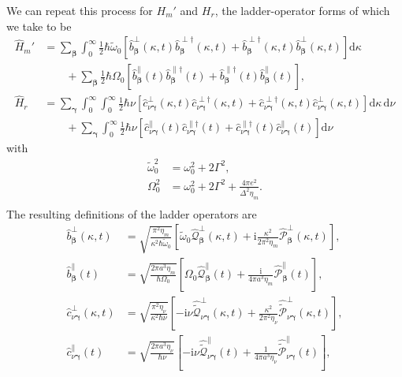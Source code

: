 \documentclass{article}
\begin{document}
We can repeat this process for $H_m'$ and $H_r$, the ladder-operator forms of which we take to be
\begin{equation}
\begin{split}
\hat{H}_m' &= \sum_{\bm{\beta}}\int_0^\infty\frac{1}{2}\hbar\tilde{\omega}_0\left[\hat{b}_{\bm{\beta}}^\perp(\kappa,t)\hat{b}_{\bm{\beta}}^{\perp\dagger}(\kappa,t) + \hat{b}_{\bm{\beta}}^{\perp\dagger}(\kappa,t)\hat{b}_{\bm{\beta}}^\perp(\kappa,t)\right]\mathrm{d}\kappa\\
&\qquad + \sum_{\bm{\beta}}\frac{1}{2}\hbar\Omega_0\left[\hat{b}_{\bm{\beta}}^\parallel(t)\hat{b}_{\bm{\beta}}^{\parallel\dagger}(t) + \hat{b}_{\bm{\beta}}^{\parallel\dagger}(t)\hat{b}_{\bm{\beta}}^\parallel(t)\right],\\
\hat{H}_r &= \sum_{\bm{\gamma}}\int_0^\infty\int_0^\infty\frac{1}{2}\hbar\nu\left[\hat{c}_{\nu\bm{\gamma}}^\perp(\kappa,t)\hat{c}_{\nu\bm{\gamma}}^{\perp\dagger}(\kappa,t) + \hat{c}_{\nu\bm{\gamma}}^{\perp\dagger}(\kappa,t)\hat{c}_{\nu\bm{\gamma}}^\perp(\kappa,t)\right]\mathrm{d}\kappa\,\mathrm{d}\nu\\
&\qquad + \sum_{\bm{\gamma}}\int_0^\infty\frac{1}{2}\hbar\nu\left[\hat{c}_{\nu\bm{\gamma}}^\parallel(t)\hat{c}_{\nu\bm{\gamma}}^{\parallel\dagger}(t) + \hat{c}_{\nu\bm{\gamma}}^{\parallel\dagger}(t)\hat{c}_{\nu\bm{\gamma}}^\parallel(t)\right]\mathrm{d}\nu
\end{split}
\end{equation}
with
\begin{equation}
\begin{split}
\tilde{\omega}_0^2 &= \omega_0^2 + 2\Gamma^2,\\
\Omega_0^2 &= \omega_0^2 + 2\Gamma^2 + \frac{4\pi e^2}{\Delta^2\eta_m}.\\
\end{split}    
\end{equation}
The resulting definitions of the ladder operators are
\begin{equation}
\begin{split}
\hat{b}_{\bm{\beta}}^\perp(\kappa,t) &= \sqrt{\frac{\pi^2\eta_m}{\kappa^2\hbar\tilde{\omega}_0}}\left[\tilde{\omega}_0\hat{\mathcal{Q}}_{\bm{\beta}}^\perp(\kappa,t) + \mathrm{i}\frac{\kappa^2}{2\pi^2\eta_m}\hat{\mathcal{P}}_{\bm{\beta}}^\perp(\kappa,t)\right],\\
\hat{b}_{\bm{\beta}}^\parallel(t) &= \sqrt{\frac{2\pi a^3\eta_m}{\hbar\Omega_0}}\left[\Omega_0\hat{\mathcal{Q}}_{\bm{\beta}}^\parallel(t) + \frac{\mathrm{i}}{4\pi a^3\eta_m}\hat{\mathcal{P}}_{\bm{\beta}}^\parallel(t)\right],\\
\hat{c}_{\nu\bm{\gamma}}^\perp(\kappa,t) &= \sqrt{\frac{\pi^2\eta_\nu}{\kappa^2\hbar\nu}}\left[-\mathrm{i}\nu\hat{\tilde{\mathcal{Q}}}_{\nu\bm{\gamma}}^\perp(\kappa,t) + \frac{\kappa^2}{2\pi^2\eta_\nu}\hat{\tilde{\mathcal{P}}}_{\nu\bm{\gamma}}^\perp(\kappa,t)\right],\\
\hat{c}_{\nu\bm{\gamma}}^\parallel(t) &= \sqrt{\frac{2\pi a^3\eta_\nu}{\hbar\nu}}\left[-\mathrm{i}\nu\hat{\tilde{\mathcal{Q}}}_{\nu\bm{\gamma}}^\parallel(t) + \frac{1}{4\pi a^3\eta_\nu}\hat{\tilde{\mathcal{P}}}_{\nu\bm{\gamma}}^\parallel(t)\right],
\end{split}
\end{equation}
\end{document}
